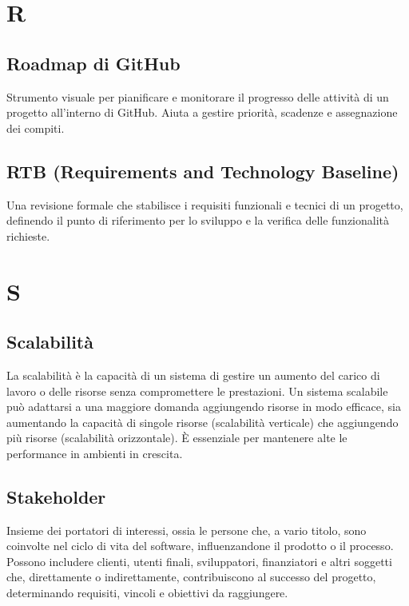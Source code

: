 \documentclass{article}
\begin{document}
\newpage

\section{R}

\subsection{Roadmap di GitHub}
Strumento visuale per pianificare e monitorare il progresso delle attività di un progetto all'interno di GitHub. Aiuta a gestire priorità, scadenze e assegnazione dei compiti.

\subsection{RTB (Requirements and Technology Baseline)}
Una revisione formale che stabilisce i requisiti funzionali e tecnici di un progetto, definendo il punto di riferimento per lo sviluppo e la verifica delle funzionalità richieste.

\newpage
\section{S}

\subsection{Scalabilità}
La scalabilità è la capacità di un sistema di gestire un aumento del carico di lavoro o delle risorse senza compromettere le prestazioni. Un sistema scalabile può adattarsi a una maggiore domanda aggiungendo risorse in modo efficace, sia aumentando la capacità di singole risorse (scalabilità verticale) che aggiungendo più risorse (scalabilità orizzontale). È essenziale per mantenere alte le performance in ambienti in crescita.

\subsection{Stakeholder}
Insieme dei portatori di interessi, ossia le persone che, a vario titolo, sono coinvolte nel ciclo di vita del software, influenzandone il prodotto o il processo. Possono includere clienti, utenti finali, sviluppatori, finanziatori e altri soggetti che, direttamente o indirettamente, contribuiscono al successo del progetto, determinando requisiti, vincoli e obiettivi da raggiungere.
\end{document}
